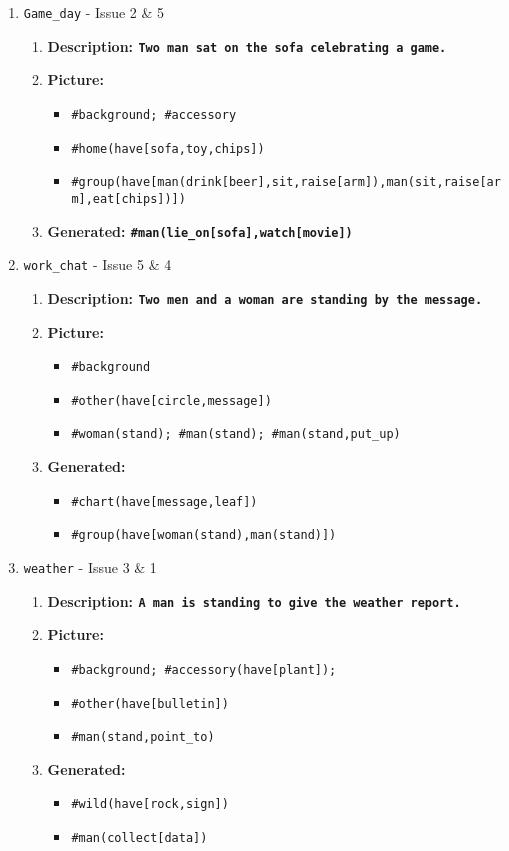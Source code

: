 \documentclass{article} %
\begin{document}
\begin{enumerate}
	\item \verb|Game_day| - Issue 2 \& 5
	\begin{enumerate}
		\item \bf{Description}: \verb|Two man sat on the sofa celebrating a game.|
		\item \bf{Picture}: 
		\begin{itemize}
			\item \verb|#background; #accessory|
			\item \verb|#home(have[sofa,toy,chips])|
			\item \verb|#group(have[man(drink[beer],sit,raise[arm]),man(sit,raise[arm],eat[chips])])|
		\end{itemize}
		\item \bf{Generated}: \verb|#man(lie_on[sofa],watch[movie])|
	\end{enumerate}
	
	\item \verb|work_chat| - Issue 5 \& 4
	\begin{enumerate}
		\item \bf{Description}: \verb|Two men and a woman are standing by the message.|
		\item \bf{Picture}: 
		\begin{itemize}
			\item \verb|#background|
			\item \verb|#other(have[circle,message])|
			\item \verb|#woman(stand); #man(stand); #man(stand,put_up)|
		\end{itemize}
		\item \bf{Generated}: 
		\begin{itemize}
			\item \verb|#chart(have[message,leaf])|
			\item \verb|#group(have[woman(stand),man(stand)])|
		\end{itemize}
		
	\end{enumerate}

	\item \verb|weather| - Issue 3 \& 1
	\begin{enumerate}
		\item \bf{Description}: \verb|A man is standing to give the weather report.|
		\item \bf{Picture}: 
		\begin{itemize}
			\item \verb|#background; #accessory(have[plant]);|
			\item \verb|#other(have[bulletin])|
			\item \verb|#man(stand,point_to)|
		\end{itemize}
		\item \bf{Generated}: 
		\begin{itemize}
			\item \verb|#wild(have[rock,sign])|
			\item \verb|#man(collect[data])|
		\end{itemize}
		
	\end{enumerate}
			
\end{enumerate}
\end{document}
